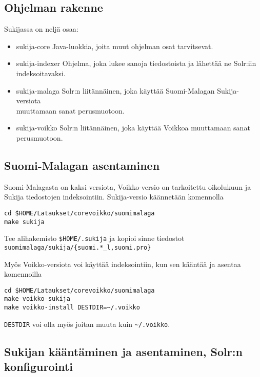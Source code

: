 \documentclass[12pt,a4paper]{scrartcl}
\begin{document}
\newpage
\subsection*{Ohjelman rakenne}

Sukijassa on neljä osaa:

\begin{itemize}
\item sukija-core     Java-luokkia, joita muut ohjelman osat tarvitsevat.
\item sukija-indexer  Ohjelma, joka lukee sanoja tiedostoista ja lähettää
                      ne Solr:iin indeksoitavaksi.
\item sukija-malaga   Solr:n liitännäinen, joka käyttää Suomi-Malagan
                      Sukija-versiota \\muuttamaan sanat perusmuotoon.
\item sukija-voikko   Solr:n liitännäinen, joka käyttää Voikkoa
                      muuttamaan sanat perusmuotoon.
\end{itemize}


\subsection*{Suomi-Malagan asentaminen}

Suomi-Malagasta on kaksi versiota, Voikko-versio on tarkoitettu
oikolukuun ja Sukija tiedostojen indeksointiin. Sukija-versio
käännetään komennolla

\begin{verbatim}
cd $HOME/Lataukset/corevoikko/suomimalaga
make sukija
\end{verbatim}

Tee alihakemisto \verb=$HOME/.sukija= ja kopioi sinne tiedostot \\
\verb=suomimalaga/sukija/{suomi.*_l,suomi.pro}=

Myös Voikko-versiota voi käyttää indeksointiin, kun sen kääntää ja
asentaa komennoilla

\begin{verbatim}
cd $HOME/Lataukset/corevoikko/suomimalaga
make voikko-sukija
make voikko-install DESTDIR=~/.voikko
\end{verbatim}

\verb|DESTDIR| voi olla myös joitan muuta kuin \verb|~/.voikko|.


\subsection*{Sukijan kääntäminen ja asentaminen, Solr:n konfigurointi}
\end{document}
